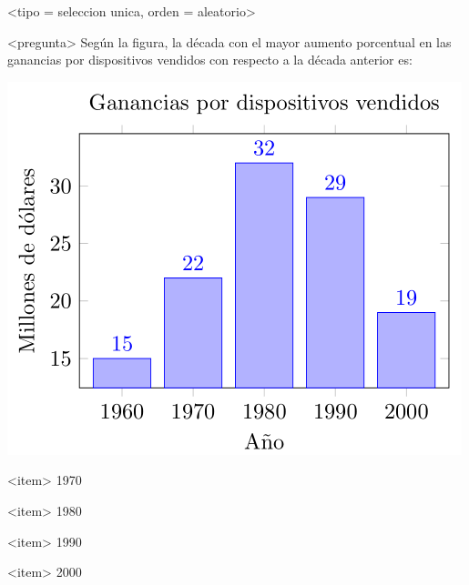 <tipo = seleccion unica, orden = aleatorio>

<pregunta>
Según la figura, la década con el mayor aumento porcentual en las ganancias por dispositivos vendidos con respecto a la década anterior es:
\begin{center}
  \includegraphics[scale=0.5]{ganancias.png}
\end{center}

<item>
1970

<item>
1980

<item>
1990

<item>
2000

